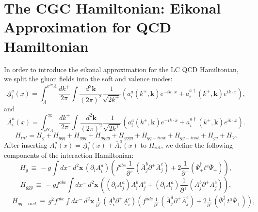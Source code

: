 \documentclass[10pt]{article}
\numberwithin{equation}{section}
\begin{document}
\section{The CGC Hamiltonian: Eikonal Approximation for  QCD Hamiltonian}
In order to introduce the eikonal approximation for the LC QCD Hamiltonian, we split the gluon fields into  the soft and valence modes: 
\begin{equation}\label{Am}
\underline{A}_{i}^{a}(x)=\int_{\Lambda}^{e^{\delta\mathsf{Y}}\Lambda}\frac{dk^{+}}{2\pi}\int\frac{d^{2}\mathbf{k}}{(2\pi)^{2}}\frac{1}{\sqrt{2k^{+}}}\left(a_{i}^{a}(k^{+},\mathbf{k})e^{-ik\cdot x}+a_{i}^{a\dagger}(k^{+},\mathbf{k})e^{ik\cdot x}\right),
 \end{equation}
and
\begin{equation}\label{Ap}
\overline{A}_{i}^{a}(x)=\int_{e^{\delta\mathsf{Y}}\Lambda}^{\infty}\frac{dk^{+}}{2\pi}\int\frac{d^{2}\mathbf{k}}{(2\pi)^{2}}\frac{1}{\sqrt{2k^{+}}}\left(a_{i}^{a}(k^{+},\mathbf{k})e^{-ik\cdot x}+a_{i}^{a\dagger}(k^{+},\mathbf{k})e^{ik\cdot x}\right).
 \end{equation}
 \begin{equation}
H_{int}=H_{g}+H_{gqq}+H_{ggg}+H_{gggg}+H_{ggqq}+H_{qq-inst}+H_{gg-inst}+H_{gq}+H_{V}.
  \end{equation}
After inserting $A_{i}^{a}(x)=\underline{A}_{i}^{a}(x)+\overline{A}_{i}^{a}(x)$  to $H_{int}$, we define the following components of the interaction Hamiltonian:
 \begin{equation}\label{Hg}
H_{g}\,\equiv\,-g\int dx^{-}\, d^{2}\mathbf{x}\,(\partial_{i}\underline{A}_{i}^{a})\left(f^{abc}\frac{1}{\partial^{+}}(\overline{A}_{j}^{b}\partial^{+}\overline{A}_{j}^{c})+2\frac{1}{\partial^{+}}(\overline{\Psi}_{+}^{\dagger}t^{a}\overline{\Psi}_{+})\right),
  \end{equation}
\begin{equation}\label{hggg}
H_{ggg}\,\equiv\,-gf^{abc}\int dx^{-}\, d^{2}\mathbf{x}\,\left((\partial_{i}\underline{A}_{j}^{a})\underline{A}_{i}^{b}\underline{A}_{j}^{c}+(\partial_{i}\underline{A}_{i}^{a})\frac{1}{\partial^{+}}(\underline{A}_{j}^{b}\partial^{+}\underline{A}_{j}^{c})\right),
 \end{equation}
  \begin{equation}\begin{split}\label{ggi}
&H_{gg-inst}\,\equiv\,g^{2}f^{abc}\int dx^{-}\, d^{2}\mathbf{x}\,\frac{1}{\partial^{+}}(\underline{A}_{i}^{b}\partial^{+}\underline{A}_{i}^{c})\left(f^{ade}\frac{1}{\partial^{+}}(\overline{A}_{j}^{d}\partial^{+}\overline{A}_{j}^{e})+2\frac{1}{\partial^{+}}(\overline{\Psi}_{+}^{\dagger}t^{a}\overline{\Psi}_{+})\right),
 \end{split}\end{equation}
\end{document}
